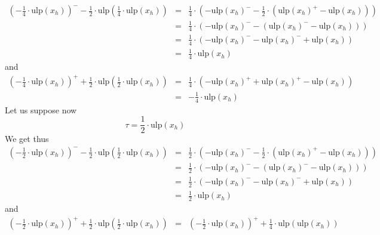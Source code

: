 \documentclass[a4paper,10pt,twoside]{article}
\newenvironment{proof}[1][Proof]{\begin{trivlist}
\item[\hskip \labelsep {\bfseries #1}]}{\end{trivlist}}
\newcommand{\hi}{\ensuremath{\mathit{h}}}
\newcommand{\mUlp}{\ensuremath{\mathrm{ulp}}}
\begin{document}
\begin{proof}
\begin{eqnarray*}
\left( - \frac{1}{4} \cdot  \mUlp\left( x_\hi \right)  \right)^- - \frac{1}{2} \cdot \mUlp\left( \frac{1}{4} \cdot  \mUlp\left( x_\hi \right)  \right) 
& = & \frac{1}{4} \cdot \left( - \mUlp\left( x_\hi \right)^- - \frac{1}{2} \cdot \left(  \mUlp\left( x_\hi \right)^+ 
-  \mUlp\left( x_\hi \right)  \right) \right) \\
& = & \frac{1}{4} \cdot \left( - \mUlp\left( x_\hi \right)^- - \left(  \mUlp\left( x_\hi \right)^- -  \mUlp\left( x_\hi \right)  \right) \right) \\
& = & \frac{1}{4} \cdot \left( - \mUlp\left( x_\hi \right)^- -  \mUlp\left( x_\hi \right)^- +  \mUlp\left( x_\hi \right)  \right) \\
& = & \frac{1}{4} \cdot  \mUlp\left( x_\hi \right) 
\end{eqnarray*}
and
\begin{eqnarray*} 
\left( - \frac{1}{4} \cdot  \mUlp\left( x_\hi \right)  \right)^+ + \frac{1}{2} \cdot \mUlp\left( \frac{1}{2} \cdot  \mUlp\left( x_\hi \right)  \right)
& = & \frac{1}{4} \cdot \left( - \mUlp\left( x_\hi \right)^+ +  \mUlp\left( x_\hi \right)^+ -  \mUlp\left( x_\hi \right)  \right) \\
& = & - \frac{1}{4} \cdot  \mUlp\left( x_\hi \right) 
\end{eqnarray*}
Let us suppose now
$$\tau = \frac{1}{2} \cdot \mUlp \left( x_\hi \right) $$
We get thus 
\begin{eqnarray*}
\left( - \frac{1}{2} \cdot  \mUlp\left( x_\hi \right)  \right)^- - \frac{1}{2} \cdot \mUlp\left( \frac{1}{2} \cdot  \mUlp\left( x_\hi \right)  \right) 
& = & \frac{1}{2} \cdot \left( - \mUlp\left( x_\hi \right)^- - \frac{1}{2} \cdot \left(  \mUlp\left( x_\hi \right)^+ 
-  \mUlp\left( x_\hi \right)  \right) \right) \\
& = & \frac{1}{2} \cdot \left( - \mUlp\left( x_\hi \right)^- - \left(  \mUlp\left( x_\hi \right)^- -  \mUlp\left( x_\hi \right)  \right) \right) \\
& = & \frac{1}{2} \cdot \left( - \mUlp\left( x_\hi \right)^- -  \mUlp\left( x_\hi \right)^- +  \mUlp\left( x_\hi \right)  \right) \\
& = & \frac{1}{2} \cdot  \mUlp\left( x_\hi \right) 
\end{eqnarray*}
and
\begin{eqnarray*} 
\left( - \frac{1}{2} \cdot  \mUlp\left( x_\hi \right)  \right)^+ + \frac{1}{2} \cdot \mUlp\left( \frac{1}{2} \cdot  \mUlp\left( x_\hi \right)  \right)
& = & \left(- \frac{1}{2} \cdot  \mUlp\left( x_\hi \right) \right)^+ + \frac{1}{4} \cdot \mUlp\left(  \mUlp\left( x_\hi \right)  \right) \\

\end{eqnarray*}
\end{proof}
\end{document}
